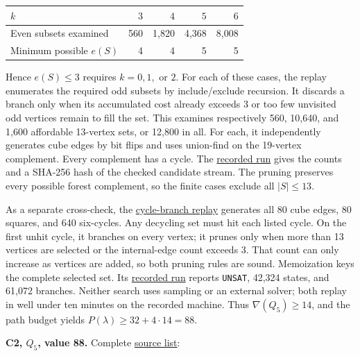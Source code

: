 \documentclass[11pt,a4paper]{article}
\begin{document}
{\def\LTcaptype{none} %
\begin{longtable}[]{@{}lrrrr@{}}
\toprule\noalign{}
\(k\) & \(3\) & \(4\) & \(5\) & \(6\) \\
\midrule\noalign{}
\endhead
\bottomrule\noalign{}
\endlastfoot
Even subsets examined & 560 & 1,820 & 4,368 & 8,008 \\
Minimum possible \(e(S)\) & 4 & 4 & 5 & 5 \\
\end{longtable}
}

Hence \(e(S)\le3\) requires \(k=0,1,\) or \(2\). For each of these cases, the replay enumerates the required odd subsets by include/exclude recursion. It discards a branch only when its accumulated cost already exceeds 3 or too few unvisited odd vertices remain to fill the set. This examines respectively 560, 10,640, and 1,600 affordable 13-vertex sets, or 12,800 in all. For each, it independently generates cube edges by bit flips and uses union-find on the 19-vertex complement. Every complement has a cycle. The \href{https://github.com/mpelteshki/climbing-to-the-frontier/blob/0680fde5d583d78c8a871bcf2bfae1028e16f117/cagent/p2/c2/decycling5_parity_replay.log}{recorded run} gives the counts and a SHA-256 hash of the checked candidate stream. The pruning preserves every possible forest complement, so the finite cases exclude all \(|S|\le13\).

As a separate cross-check, the \href{https://github.com/mpelteshki/climbing-to-the-frontier/blob/0680fde5d583d78c8a871bcf2bfae1028e16f117/cagent/p2/c2/decycling5_replay.py}{cycle-branch replay} generates all 80 cube edges, 80 squares, and 640 six-cycles. Any decycling set must hit each listed cycle. On the first unhit cycle, it branches on every vertex; it prunes only when more than 13 vertices are selected or the internal-edge count exceeds 3. That count can only increase as vertices are added, so both pruning rules are sound. Memoization keys the complete selected set. Its \href{https://github.com/mpelteshki/climbing-to-the-frontier/blob/0680fde5d583d78c8a871bcf2bfae1028e16f117/cagent/p2/c2/decycling5_replay.log}{recorded run} reports \texttt{UNSAT}, 42,324 states, and 61,072 branches. Neither search uses sampling or an external solver; both replay in well under ten minutes on the recorded machine. Thus \(\nabla(Q_5)\ge14\), and the path budget yields \(P(\lambda)\ge32+4\cdot14=88\).

\textbf{C2, \(Q_5\), value 88.} Complete \href{https://github.com/mpelteshki/climbing-to-the-frontier/blob/0680fde5d583d78c8a871bcf2bfae1028e16f117/cagent/p2/c2/q5-labels.txt}{source list}:
\end{document}
